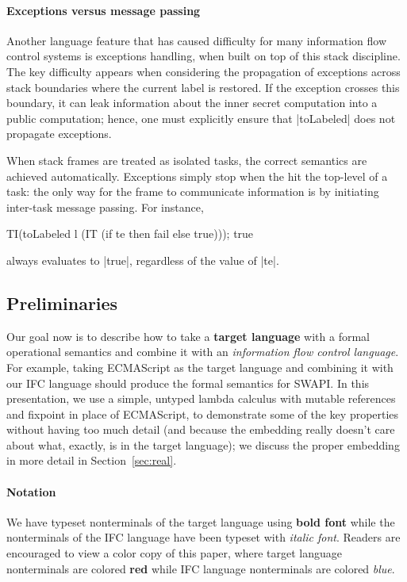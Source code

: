 \paragraph{Exceptions versus message passing}
Another language feature that has caused difficulty for
many information flow control systems is exceptions handling,
when built on top of this stack discipline.
%
The key difficulty appears when considering the propagation of exceptions
across stack boundaries where the current label is restored.
%
If the exception crosses this boundary, it can leak information about the
inner secret computation into a public computation; hence, one must
explicitly ensure that |toLabeled| does not propagate exceptions.

When stack frames are treated as isolated tasks, the correct semantics
are achieved automatically.
%
Exceptions simply stop when the hit the top-level of a task:
the only way for the frame to communicate information is by
initiating inter-task message passing.
%
For instance, 
\begin{code}
TI(toLabeled l (IT (if te then fail else true))); true
\end{code}
always evaluates to |true|, regardless of the value of |te|.

\subsection{Preliminaries}

Our goal now is to
describe how to take a \textbf{{\color{red} target
language}} with a formal operational semantics and combine it with an
\textit{{\color{blue} information flow control language}}.  For example,
taking ECMAScript as the target language and combining it with our IFC
language should produce the formal semantics for SWAPI.  In this
presentation, we use a simple, untyped lambda calculus with mutable
references and fixpoint in place of ECMAScript, to demonstrate some of the key
properties without having too much detail (and because the embedding really
doesn't care about what, exactly, is in the target language); we discuss the proper
embedding in more detail in Section~\ref{sec:real}.

\paragraph{Notation}
We have typeset nonterminals of the target language using \textbf{{\color{red}
bold font}} while the nonterminals of the IFC language have been typeset
with \textit{{\color{blue} italic font}}.  Readers are encouraged to view
a color copy of this paper, where target language nonterminals are colored \textbf{{\color{red} red}}
while IFC language nonterminals are colored \textit{{\color{blue} blue}}.

